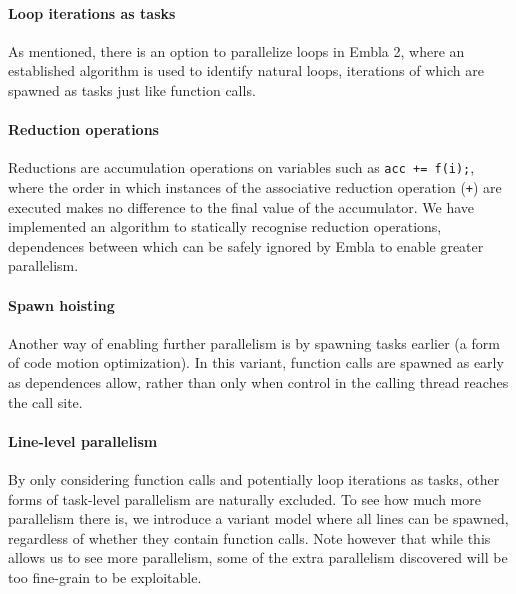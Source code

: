 \paragraph*{Loop iterations as tasks}
As mentioned, there is an option to parallelize loops in Embla 2,
where an established algorithm \cite{aho86compilers} is used to identify natural loops,
iterations of which are spawned as tasks just like function calls.

\paragraph*{Reduction operations}
Reductions are accumulation operations on variables such as \texttt{acc += f(i);},
where the order in which instances of the associative reduction operation ({\tt+})
are executed makes no difference to the final value of the accumulator.
We have implemented an algorithm to statically recognise reduction operations,
dependences between which can be safely ignored by Embla to enable greater parallelism.

\paragraph*{Spawn hoisting}
Another way of enabling further parallelism is by spawning tasks earlier (a form of code motion optimization).
In this variant, function calls are spawned as early as dependences allow,
rather than only when control in the calling thread reaches the call site.

\paragraph*{Line-level parallelism}
By only considering function calls and potentially loop iterations as tasks, other forms of task-level parallelism are naturally excluded.
To see how much more parallelism there is, we introduce a variant model where all lines can be spawned, regardless of whether they contain function calls.
Note however that while this allows us to see more parallelism, some of the extra parallelism discovered will be too fine-grain to be exploitable.





































